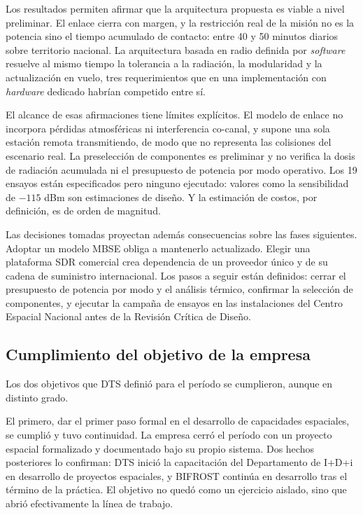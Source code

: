 Los resultados permiten afirmar que la arquitectura propuesta es viable a nivel preliminar. El enlace cierra con margen, y la restricción real de la misión no es la potencia sino el tiempo acumulado de contacto: entre 40 y 50 minutos diarios sobre territorio nacional. La arquitectura basada en radio definida por \textit{software} resuelve al mismo tiempo la tolerancia a la radiación, la modularidad y la actualización en vuelo, tres requerimientos que en una implementación con \textit{hardware} dedicado habrían competido entre sí.

El alcance de esas afirmaciones tiene límites explícitos. El modelo de enlace no incorpora pérdidas atmosféricas ni interferencia co-canal, y supone una sola estación remota transmitiendo, de modo que no representa las colisiones del escenario real. La preselección de componentes es preliminar y no verifica la dosis de radiación acumulada ni el presupuesto de potencia por modo operativo. Los 19 ensayos están especificados pero ninguno ejecutado: valores como la sensibilidad de $-115$ dBm son estimaciones de diseño. Y la estimación de costos, por definición, es de orden de magnitud.

Las decisiones tomadas proyectan además consecuencias sobre las fases siguientes. Adoptar un modelo MBSE obliga a mantenerlo actualizado. Elegir una plataforma SDR comercial crea dependencia de un proveedor único y de su cadena de suministro internacional. Los pasos a seguir están definidos: cerrar el presupuesto de potencia por modo y el análisis térmico, confirmar la selección de componentes, y ejecutar la campaña de ensayos en las instalaciones del Centro Espacial Nacional antes de la Revisión Crítica de Diseño.


\subsection{Cumplimiento del objetivo de la empresa}

Los dos objetivos que DTS definió para el período se cumplieron, aunque en distinto grado.

El primero, dar el primer paso formal en el desarrollo de capacidades espaciales, se cumplió y tuvo continuidad. La empresa cerró el período con un proyecto espacial formalizado y documentado bajo su propio sistema. Dos hechos posteriores lo confirman: DTS inició la capacitación del Departamento de I+D+i en desarrollo de proyectos espaciales, y BIFROST continúa en desarrollo tras el término de la práctica. El objetivo no quedó como un ejercicio aislado, sino que abrió efectivamente la línea de trabajo.

